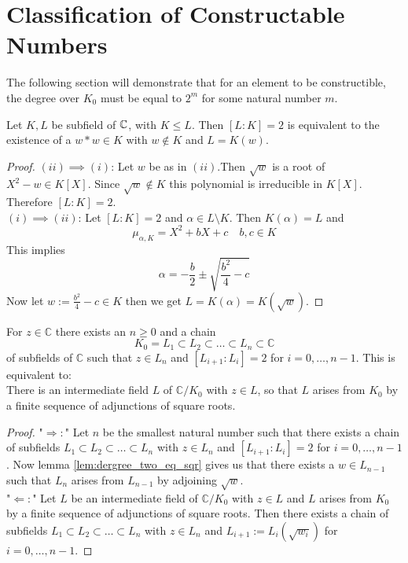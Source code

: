 \section{Classification of Constructable Numbers}
The following section will demonstrate that for an element to be constructible, the degree over $K_0$ must be equal to $2^m$ for some natural number $m$.

\begin{lemma}
    \label{lem:dergree_two_eq_sqr}
    \leanok
    Let $K, L$ be subfield of $\mathbb{C}$, with $K\le L$. Then $[L:K] = 2$ is equivalent to the existence of a $w*w \in K$ with $w \notin K$ and $L = K(w)$.
\end{lemma}
\begin{proof}
    \leanok
    $(ii)\implies (i)$: Let $w$ be as in $(ii)$.Then $\sqrt{w}$ is a root of $X^2 - w \in K[X]$. Since $\sqrt{w} \notin K$ this polynomial is irreducible in $K[X]$. Therefore $[L:K] = 2$.\\
    $(i)\implies (ii)$: Let $[L:K] = 2$ and $\alpha \in L \setminus K$. Then $K(\alpha) = L$ and 
    $$\mu_{\alpha, K}=X^2 + bX + c \quad b,c \in K$$
    This implies 
    $$\alpha = -\frac{b}{2} \pm \sqrt{\frac{b^2}{4} - c} $$
    Now let $w := \frac{b^2}{4} - c \in K$ then we get $L = K(\alpha) = K(\sqrt{w})$.
\end{proof}


\begin{lemma}
    \label{lem:Z_in_Minf_imp_eq} 
    \leanok
    For $z \in \mathbb{C}$
    there exists an $n\ge 0$ and a chain 
    $$K_0 = L_1 \subset L_2 \subset \ldots \subset L_n \subset \mathbb{C}$$
    of subfields of $\mathbb{C}$ such that $z \in L_n$ and 
    $ [L_{i+1}:L_i] = 2 $ for $i = 0, \ldots, n-1$. This is equivalent to:\\
    There is an intermediate field $L$ of $\mathbb{C}/K_0$ with $z \in L$, so that $L$ arises from $K_0$ by a finite sequence of adjunctions of square roots.
\end{lemma}
\begin{proof}
    \leanok
    "$\Rightarrow:$" Let $n$ be the smallest natural number such that there exists a chain of subfields $L_1 \subset L_2 \subset \ldots \subset L_n$ with $z \in L_n$ and $[L_{i+1}:L_i] = 2$ for $i = 0, \ldots, n-1$. Now lemma \ref{lem:dergree_two_eq_sqr} gives us that there exists a $w \in L_{n-1}$ such that $L_n$ arises from $L_{n-1}$ by adjoining $\sqrt{w}$.\\
    "$\Leftarrow:$" Let $L$ be an intermediate field of $\mathbb{C}/K_0$ with $z \in L$ and $L$ arises from $K_0$ by a finite sequence of adjunctions of square roots. Then there exists a chain of subfields $L_1 \subset L_2 \subset \ldots \subset L_n$ with $z \in L_n$ and $L_{i+1}:= L_i(\sqrt{w_i})$ for $i = 0, \ldots, n-1$.
\end{proof}

